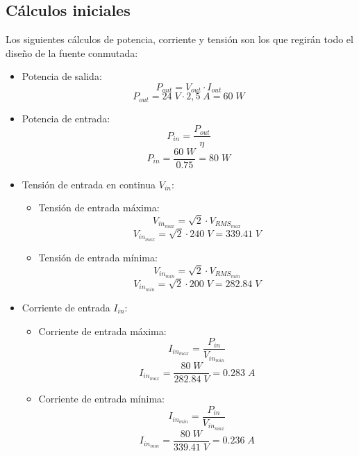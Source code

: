 \documentclass[11pt, a4paper]{article}
\begin{document}
\subsection{Cálculos iniciales}
Los siguientes cálculos de potencia, corriente y tensión son los que regirán todo el diseño de la fuente conmutada:
\begin{itemize}
	\item Potencia de salida:
	\begin{equation}
	P_{out} = V_{out} \cdot I_{out}
	\label{Pout}
	\end{equation}
	\[ P_{out} = 24 \; V \cdot 2,5 \; A = 60 \;W \]
	\item Potencia de entrada:
	\begin{equation}
	P_{in} = \frac{P_{out}}{\eta}
	\label{Pin}
	\end{equation}
	\[ P_{in} = \frac{60 \; W}{0.75} = 80 \; W \]
	\item Tensión de entrada en continua $V_{in}$:
		\begin{itemize}
			\item Tensión de entrada máxima:
			\begin{equation}
				V_{in_{max}} = \sqrt{2} \cdot V_{RMS_{max}}
			\label{Vinmax}
			\end{equation}
			\[ V_{in_{max}} = \sqrt{2} \cdot 240 \; V = 339.41 \; V \]
			\item Tensión de entrada mínima:
			\begin{equation}
				V_{in_{min}} = \sqrt{2} \cdot V_{RMS_{min}}
			\label{Vinmin}
			\end{equation}
			\[ V_{in_{min}} = \sqrt{2} \cdot 200 \; V = 282.84 \; V \]
		\end{itemize}
	\item Corriente de entrada $I_{in}$:
	\begin{itemize}
		\item Corriente de entrada máxima:
		\begin{equation}
			I_{in_{max}} = \frac{P_{in}}{V_{in_{min}}}
		\label{Iinmax}
		\end{equation}
		\[ I_{in_{max}} = \frac{80 \; W}{282.84 \; V} = 0.283 \; A \]
		\item Corriente de entrada mínima:
		\begin{equation}
			I_{in_{min}} = \frac{P_{in}}{V_{in_{max}}}
		\label{Iinmin}
		\end{equation}
		\[ I_{in_{min}} = \frac{80 \; W}{339.41 \; V} = 0.236 \; A \]
	\end{itemize}
\end{itemize}
\end{document}
